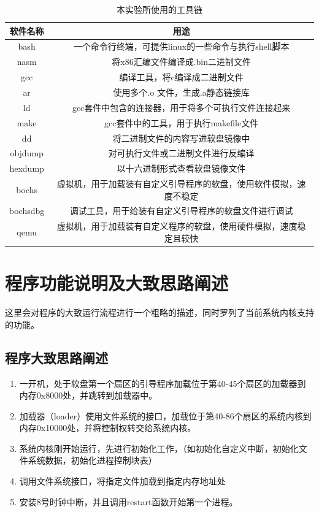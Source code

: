 \documentclass[forprint]{WHUBachelor}
\begin{document}
\begin{table}[htp]
  \caption{本实验所使用的工具链}
  \centering
  \begin{tabular}{cc}
    \toprule
    软件名称 & 用途  \\
    \midrule
    bash & 一个命令行终端，可提供linux的一些命令与执行shell脚本 \\
    nasm & 将x86汇编文件编译成.bin二进制文件 \\
    gcc & 编译工具，将c编译成二进制文件 \\
    ar & 使用多个.o 文件，生成.a静态链接库  \\
    ld & gcc套件中包含的连接器，用于将多个可执行文件连接起来 \\
    make & gcc套件中的工具，用于执行makefile文件 \\
    dd & 将二进制文件的内容写进软盘镜像中  \\
    objdump & 对可执行文件或二进制文件进行反编译 \\
    hexdump & 以十六进制形式查看软盘镜像文件 \\
    bochs & 虚拟机，用于加载装有自定义引导程序的软盘，使用软件模拟，速度不稳定  \\
    bochsdbg & 调试工具，用于给装有自定义引导程序的软盘文件进行调试 \\
    qemu & 虚拟机，用于加载装有自定义程序的软盘，使用硬件模拟，速度稳定且较快 \\
    \bottomrule
  \end{tabular}
  \label{tab:tools}
\end{table}

\section{程序功能说明及大致思路阐述}

这里会对程序的大致运行流程进行一个粗略的描述，同时罗列了当前系统内核支持的功能。

\subsection{程序大致思路阐述}

\begin{enumerate}
  \item 一开机，处于软盘第一个扇区的引导程序加载位于第40-45个扇区的加载器到内存0x8000处，并跳转到加载器中。
  \item 加载器（loader）使用文件系统的接口，加载位于第40-86个扇区的系统内核到内存0x10000处，并将控制权转交给系统内核。
  \item 系统内核刚开始运行，先进行初始化工作，（如初始化自定义中断，初始化文件系统数据，初始化进程控制块表）
  \item 调用文件系统接口，将指定文件加载到指定内存地址处
  \item 安装8号时钟中断，并且调用restart函数开始第一个进程。
\end{enumerate}
\end{document}
